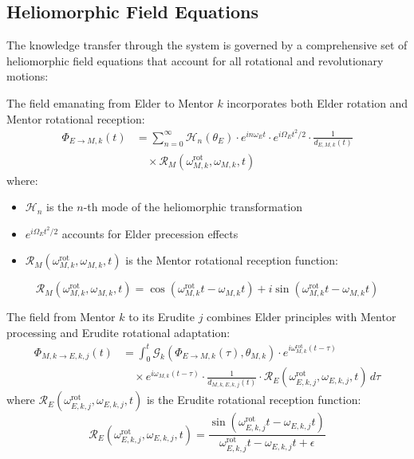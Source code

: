 \subsection{Heliomorphic Field Equations}

The knowledge transfer through the system is governed by a comprehensive set of heliomorphic field equations that account for all rotational and revolutionary motions:

\begin{definition}
The field emanating from Elder to Mentor $k$ incorporates both Elder rotation and Mentor rotational reception:
\begin{align}
\Phi_{E \rightarrow M,k}(t) &= \sum_{n=0}^{\infty} \mathcal{H}_n(\theta_E) \cdot e^{in\omega_E t} \cdot e^{i\Omega_E t^2/2} \cdot \frac{1}{d_{E,M,k}(t)} \\
&\quad \times \mathcal{R}_M(\omega_{M,k}^{\text{rot}}, \omega_{M,k}, t)
\end{align}
where:
\begin{itemize}
    \item $\mathcal{H}_n$ is the $n$-th mode of the heliomorphic transformation
    \item $e^{i\Omega_E t^2/2}$ accounts for Elder precession effects
    \item $\mathcal{R}_M(\omega_{M,k}^{\text{rot}}, \omega_{M,k}, t)$ is the Mentor rotational reception function:
\end{itemize}
\begin{equation}
\mathcal{R}_M(\omega_{M,k}^{\text{rot}}, \omega_{M,k}, t) = \cos(\omega_{M,k}^{\text{rot}} t - \omega_{M,k} t) + i\sin(\omega_{M,k}^{\text{rot}} t - \omega_{M,k} t)
\end{equation}
\end{definition}

\begin{definition}
The field from Mentor $k$ to its Erudite $j$ combines Elder principles with Mentor processing and Erudite rotational adaptation:
\begin{align}
\Phi_{M,k \rightarrow E,k,j}(t) &= \int_0^t \mathcal{G}_k(\Phi_{E \rightarrow M,k}(\tau), \theta_{M,k}) \cdot e^{i\omega_{M,k}^{\text{rot}}(t-\tau)} \\
&\quad \times e^{i\omega_{M,k}(t-\tau)} \cdot \frac{1}{d_{M,k,E,k,j}(t)} \cdot \mathcal{R}_E(\omega_{E,k,j}^{\text{rot}}, \omega_{E,k,j}, t) \, d\tau
\end{align}
where $\mathcal{R}_E(\omega_{E,k,j}^{\text{rot}}, \omega_{E,k,j}, t)$ is the Erudite rotational reception function:
\begin{equation}
\mathcal{R}_E(\omega_{E,k,j}^{\text{rot}}, \omega_{E,k,j}, t) = \frac{\sin(\omega_{E,k,j}^{\text{rot}} t - \omega_{E,k,j} t)}{\omega_{E,k,j}^{\text{rot}} t - \omega_{E,k,j} t + \epsilon}
\end{equation}
\end{definition}

